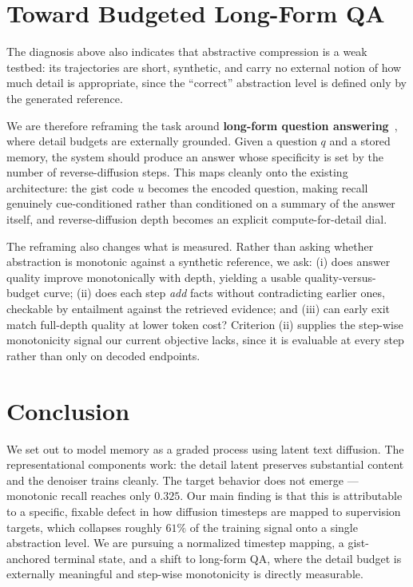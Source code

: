 \documentclass{article}
\begin{document}
\section{Toward Budgeted Long-Form QA}
\label{sec:qa}

The diagnosis above also indicates that abstractive compression is a weak testbed: its trajectories are short, synthetic, and carry no external notion of how much detail is appropriate, since the ``correct'' abstraction level is defined only by the generated reference.

We are therefore reframing the task around \textbf{long-form question answering}~\citep{fan2019,stelmakh2022}, where detail budgets are externally grounded. Given a question $q$ and a stored memory, the system should produce an answer whose specificity is set by the number of reverse-diffusion steps. This maps cleanly onto the existing architecture: the gist code $u$ becomes the encoded question, making recall genuinely cue-conditioned rather than conditioned on a summary of the answer itself, and reverse-diffusion depth becomes an explicit compute-for-detail dial.

The reframing also changes what is measured. Rather than asking whether abstraction is monotonic against a synthetic reference, we ask: (i) does answer quality improve monotonically with depth, yielding a usable quality-versus-budget curve; (ii) does each step \emph{add} facts without contradicting earlier ones, checkable by entailment against the retrieved evidence; and (iii) can early exit match full-depth quality at lower token cost? Criterion (ii) supplies the step-wise monotonicity signal our current objective lacks, since it is evaluable at every step rather than only on decoded endpoints.

\section{Conclusion}

We set out to model memory as a graded process using latent text diffusion. The representational components work: the detail latent preserves substantial content and the denoiser trains cleanly. The target behavior does not emerge --- monotonic recall reaches only $0.325$. Our main finding is that this is attributable to a specific, fixable defect in how diffusion timesteps are mapped to supervision targets, which collapses roughly $61\%$ of the training signal onto a single abstraction level. We are pursuing a normalized timestep mapping, a gist-anchored terminal state, and a shift to long-form QA, where the detail budget is externally meaningful and step-wise monotonicity is directly measurable.
\end{document}
